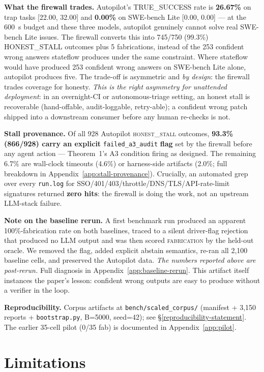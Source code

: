 \textbf{What the firewall trades.} Autopilot's TRUE\_SUCCESS rate is
\textbf{26.67\%} on trap tasks [22.00, 32.00] and \textbf{0.00\%} on SWE-bench Lite
[0.00, 0.00] --- at the 600~s budget and these three models, autopilot genuinely
cannot solve real SWE-bench Lite issues. The firewall converts this into
745/750 (99.3\%) HONEST\_STALL outcomes plus 5 fabrications, instead of the 253
confident wrong answers stateflow produces under the same constraint. Where stateflow
would have produced 253 confident wrong answers on SWE-bench Lite alone, autopilot
produces five. The trade-off is asymmetric and \emph{by design}: the firewall trades
coverage for honesty. \emph{This is the right asymmetry for unattended deployment}:
in an overnight-CI or autonomous-triage setting, an honest stall is recoverable
(hand-offable, audit-loggable, retry-able); a confident wrong patch shipped into a
downstream consumer before any human re-checks is not.

\textbf{Stall provenance.} Of all 928 Autopilot \textsc{honest\_stall} outcomes,
\textbf{93.3\% (866/928) carry an explicit} \texttt{failed\_a3\_audit} \textbf{flag} set by the
firewall before any agent action --- Theorem~1's A3 condition firing as designed. The remaining
6.7\% are wall-clock timeouts (4.6\%) or harness-side artifacts (2.0\%; full breakdown in
Appendix~\ref{app:stall-provenance}). Crucially, an automated grep over every \texttt{run.log} for
SSO/401/403/throttle/DNS/TLS/API-rate-limit signatures returned \textbf{zero hits}: the firewall is
doing the work, not an upstream LLM-stack failure.

\textbf{Note on the baseline rerun.} A first benchmark run produced an apparent 100\%-fabrication
rate on both baselines, traced to a silent driver-flag rejection that produced no LLM output and was
then scored \textsc{fabrication} by the held-out oracle. We removed the flag, added explicit
abstain semantics, re-ran all 2{,}100 baseline cells, and preserved the Autopilot data.
\emph{The numbers reported above are post-rerun.} Full diagnosis in
Appendix~\ref{app:baseline-rerun}. This artifact itself instances the paper's lesson: confident
wrong outputs are easy to produce without a verifier in the loop.

\textbf{Reproducibility.} Corpus artifacts at \texttt{bench/scaled\_corpus/} (manifest +
3{,}150 reports + \texttt{bootstrap.py}, B=5000, seed=42); see \S\ref{reproducibility-statement}.
The earlier 35-cell pilot (0/35 fab) is documented in Appendix~\ref{app:pilot}.

\section{Limitations}\label{limitations}

